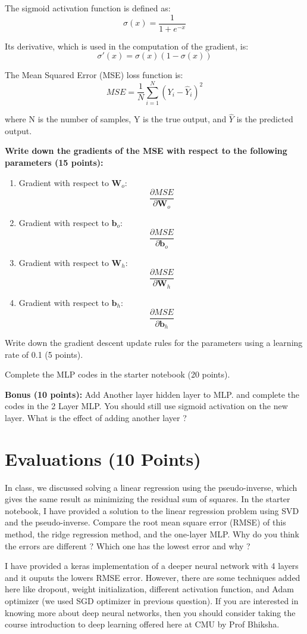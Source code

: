 The sigmoid activation function is defined as:
\[
\sigma(x) = \frac{1}{1 + e^{-x}}
\]

Its derivative, which is used in the computation of the gradient, is:
\[
\sigma'(x) = \sigma(x)(1 - \sigma(x))
\]

The Mean Squared Error (MSE) loss function is:
\[
MSE = \frac{1}{N} \sum_{i=1}^{N} (Y_i - \hat{Y}_i)^2
\]

where N is the number of samples, Y is the true output, and \(\hat{Y}\) is the predicted output.

\textbf{Write down the gradients of the MSE with respect to the following parameters (15 points):}
\begin{enumerate}
    \item Gradient with respect to $\mathbf{W}_o$: $$\frac{\partial MSE}{\partial \mathbf{W}_o}$$
    \item Gradient with respect to $\mathbf{b}_o$: $$\frac{\partial MSE}{\partial \mathbf{b}_o}$$
    \item Gradient with respect to $\mathbf{W}_h$: $$\frac{\partial MSE}{\partial \mathbf{W}_h}$$
    \item Gradient with respect to $\mathbf{b}_h$: $$\frac{\partial MSE}{\partial \mathbf{b}_h}$$
\end{enumerate}

Write down the gradient descent update rules for the parameters using a learning rate of 0.1 (5 points).

Complete the MLP codes in the starter notebook (20 points).

\textbf{Bonus (10 points):} Add Another layer hidden layer to MLP. and complete the codes in the 2 Layer MLP.
You should still use sigmoid activation on the new layer. What is the effect of adding another layer ?

\section{Evaluations (10 Points)}
In class, we discussed solving a linear regression using the pseudo-inverse, which gives the same result as minimizing the residual sum of squares. In the starter notebook, I have provided a solution to the linear regression problem using SVD and the pseudo-inverse. Compare the root mean square error (RMSE) of this method, the ridge regression method, and the one-layer MLP. Why do you think the errors are different ?
Which one has the lowest error and why ?

I have provided a keras implementation of a deeper neural network with 4 layers and it ouputs the lowers
RMSE error. However, there are some techniques added here like dropout, weight initialization, different
activation function, and Adam optimizer (we used SGD optimizer in previous question). If you are interested
in knowing more about deep neural networks, then you should consider taking the course introduction to
deep learning offered here at CMU by Prof Bhiksha.
